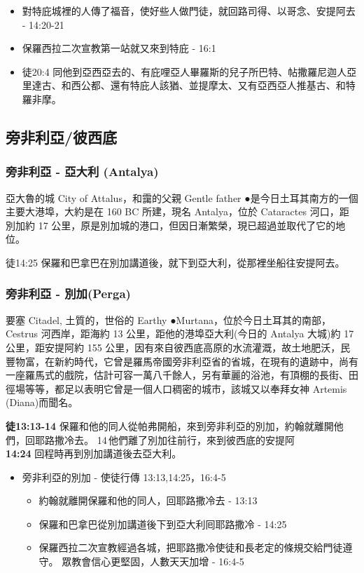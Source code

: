 \begin{itemize}
\itemsep-.25em 
\item 對特庇城裡的人傳了福音，使好些人做門徒，就回路司得、以哥念、安提阿去 - 14:20-21
\item 保羅西拉二次宣教第一站就又來到特庇 - 16:1
\item 徒20:4 同他到亞西亞去的、有庇哩亞人畢羅斯的兒子所巴特、帖撒羅尼迦人亞里達古、和西公都、還有特庇人該猶、並提摩太、又有亞西亞人推基古、和特羅非摩。
\end{itemize}


\subsection{旁非利亞/彼西底}

\subsubsection{旁非利亞 - 亞大利 (Antalya)}
亞大魯的城 City of Attalus，和靄的父親 Gentle father
●是今日土耳其南方的一個主要大港埠，大約是在 160 BC 所建，現名 Antalya，位於 Cataractes 河口，距別加約 17 公里，原是別加城的港口，但因日漸繁榮，現已超過並取代了它的地位。

徒14:25 保羅和巴拿巴在別加講道後，就下到亞大利，從那裡坐船往安提阿去。


\subsubsection{旁非利亞 - 別加(Perga)}

要塞 Citadel, 土質的，世俗的 Earthy
●Murtana，位於今日土耳其的南部，Cestrus 河西岸，距海約 13 公里，距他的港埠亞大利(今日的 Antalya 大城)約 17 公里，距安提阿約 155 公里，因有來自彼西底高原的水流灌溉，故土地肥沃，民豐物富，在新約時代，它曾是羅馬帝國旁非利亞省的省城，在現有的遺跡中，尚有一座羅馬式的戲院，估計可容一萬八千餘人，另有華麗的浴池，有頂棚的長街、田徑場等等，都足以表明它曾是一個人口稠密的城市，該城又以奉拜女神 Artemis (Diana)而聞名。

\textbf{徒13:13-14} 保羅和他的同人從帕弗開船，來到旁非利亞的別加，約翰就離開他們，回耶路撒冷去。 14 他們離了別加往前行，來到彼西底的安提阿\\

\textbf{14:24} 回程時再到別加講道後去亞大利。

\begin{itemize}
\itemsep-.25em 
\item 旁非利亞的別加 - 使徒行傳 13:13,14:25，16:4-5
\begin{itemize}
\itemsep-.25em 
\item 約翰就離開保羅和他的同人，回耶路撒冷去 - 13:13
\item 保羅和巴拿巴從別加講道後下到亞大利囘耶路撒冷 - 14:25
\item 保羅西拉二次宣教經過各城，把耶路撒冷使徒和長老定的條規交給門徒遵守。 眾教會信心更堅固，人數天天加增 - 16:4-5
\end{itemize}
\end{itemize}


